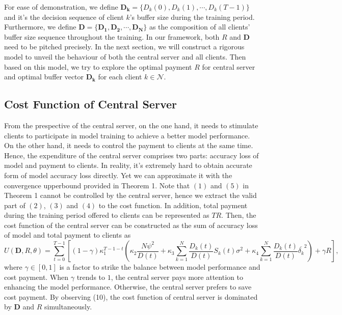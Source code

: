 \documentclass{article}
\theoremstyle{plain}
\theoremstyle{definition}
\theoremstyle{remark}
\begin{document}
For ease of demonstration, we define $\boldsymbol{D_k} = \{D_k(0), D_k(1), \cdots, D_k(T-1)\}$ and it's the decision sequence of client $k$'s buffer size during the training period.
Furthermore, we define $\boldsymbol{D} = \{\boldsymbol{D_1}, \boldsymbol{D_2}, \cdots, \boldsymbol{D_N}\}$ as the composition of all clients' buffer size sequence throughout the training.
In our framework, both $R$ and $\boldsymbol{D}$ need to be pitched precisely.
In the next section, we will construct a rigorous model to unveil the behaviour of both the central server and all clients.
Then based on this model, we try to explore the optimal payment $R$ for central server and optimal buffer vector $\boldsymbol{D_k}$ for each client $k \in \mathcal{N}$.


\subsection{Cost Function of Central Server}
From the prespective of the central server, on the one hand, it needs to stimulate clients to participate in model training to achieve a better model performance.
On the other hand, it needs to control the payment to clients at the same time.
Hence, the expenditure of the central server comprises two parts: accuracy loss of model and payment to clients. 
In reality, it's extremely hard to obtain accurate form of model accuracy loss directly. Yet we can approximate it with the convergence upperbound provided in Theorem 1.
Note that $(1)$ and $(5)$ in Theorem 1 cannot be controlled by the central server, hence we extract the valid part of $(2)$, $(3)$ and $(4)$ to the cost function.
In addition, total payment during the training period offered to clients can be represented as $TR$.
Then, the cost function of the central server can be constructed as the sum of accuracy loss of model and total payment to clients as
\begin{equation}
  U(\boldsymbol{D}, R, \theta) = \sum_{t=0}^{T-1}\left[(1-\gamma)\kappa_1^{T-1-t} \left(\kappa_2 \frac{N\psi^2}{D(t)} + \kappa_3 \sum_{k=1}^{N} \frac{D_k(t)}{D(t)} S_k(t) \sigma^2 + \kappa_4 \sum_{k=1}^{N} \frac{D_k(t)}{D(t)} \overline{\delta_k}^2\right) + \gamma R\right],
\end{equation}
where $\gamma \in [0, 1]$ is a factor to strike the balance between model performance and cost payment. When $\gamma$ trends to $1$, the central server pays more attention to enhancing the model performance. Otherwise, the central server prefers to save cost payment.
By observing (10), the cost function of central server is dominated by $\boldsymbol{D}$ and $R$ simultaneously.
\end{document}
